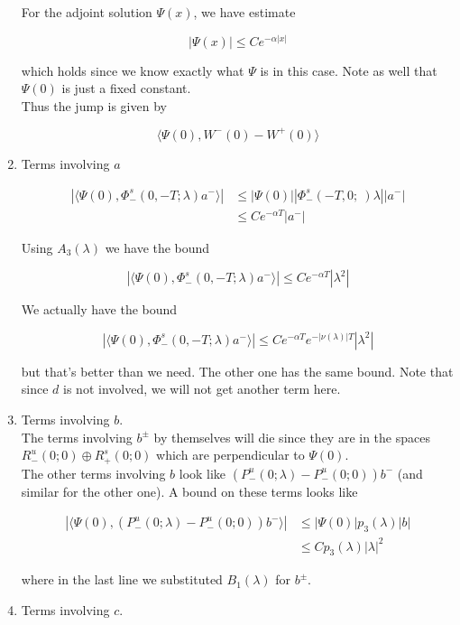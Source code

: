 \documentclass[12pt]{article}
\begin{document}
\begin{enumerate}
For the adjoint solution $\Psi(x)$, we have estimate 

\[
|\Psi(x)| \leq C e^{-\alpha|x|}
\]

which holds since we know exactly what $\Psi$ is in this case. Note as well that $\Psi(0)$ is just a fixed constant.\\

Thus the jump is given by

\[
\langle \Psi(0), W^-(0) - W^+(0) \rangle 
\]

\item Terms involving $a$

\begin{align*}
|\langle \Psi(0), \Phi^s_-(0, -T; \lambda )a^- \rangle| &\leq |\Psi(0)||\Phi^s_-(-T, 0; \
)\lambda||a^-| \\
&\leq C e^{-\alpha T} |a^-|
\end{align*}

Using $A_3(\lambda)$ we have the bound

\[
|\langle \Psi(0), \Phi^s_-(0, -T; \lambda )a^- \rangle| \leq C e^{-\alpha T} |\lambda^2|
\]

We actually have the bound 

\[
|\langle \Psi(0), \Phi^s_-(0, -T; \lambda )a^- \rangle| \leq C e^{-\alpha T} e^{-|\nu(\lambda)|T} |\lambda^2|
\]

but that's better than we need. The other one has the same bound. Note that since $d$ is not involved, we will not get another term here.

\item Terms involving $b$.\\

The terms involving $b^\pm$ by themselves will die since they are in the spaces $R^u_-(0; 0) \oplus R^s_+(0; 0)$ which are perpendicular to $\Psi(0)$.\\

The other terms involving $b$ look like $(P^u_-(0; \lambda) - P^u_-(0; 0))b^-$ (and similar for the other one). A bound on these terms looks like

\begin{align*}
|\langle \Psi(0), (P^u_-(0; \lambda) - P^u_-(0; 0))b^- \rangle|
&\leq |\Psi(0)| p_3(\lambda)|b| \\
&\leq C p_3(\lambda) |\lambda|^2
\end{align*}

where in the last line we substituted $B_1(\lambda)$ for $b^\pm$.

\item Terms involving $c$.\\


\end{enumerate}
\end{document}
